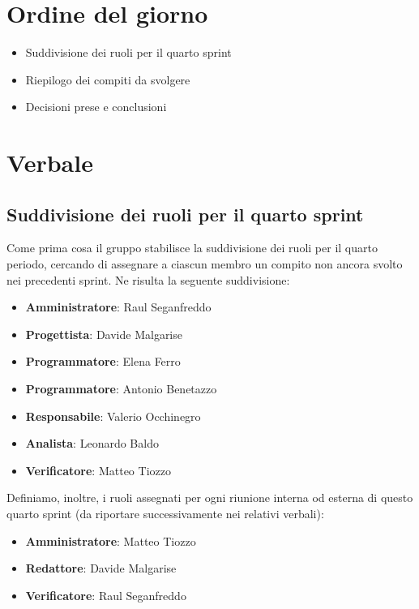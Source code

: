 \documentclass[italian,12pt]{article}
\begin{document}
\section{Ordine del giorno}
\begin{itemize}
	\item Suddivisione dei ruoli per il quarto sprint
	\item Riepilogo dei compiti da svolgere
	\item Decisioni prese e conclusioni
\end{itemize}

\newpage

\section{Verbale}

\subsection{Suddivisione dei ruoli per il quarto sprint}
Come prima cosa il gruppo stabilisce la suddivisione dei ruoli per il quarto periodo, cercando di assegnare a ciascun membro un compito non ancora svolto
nei precedenti sprint. Ne risulta la seguente suddivisione:
\begin{itemize}
	\item \textbf{Amministratore}: Raul Seganfreddo
	\item \textbf{Progettista}: Davide Malgarise
	\item \textbf{Programmatore}: Elena Ferro
	\item \textbf{Programmatore}: Antonio Benetazzo
	\item \textbf{Responsabile}: Valerio Occhinegro
	\item \textbf{Analista}: Leonardo Baldo
	\item \textbf{Verificatore}: Matteo Tiozzo
\end{itemize}
Definiamo, inoltre, i ruoli assegnati per ogni riunione interna od esterna 
di questo quarto sprint (da riportare successivamente nei relativi verbali):
\begin{itemize}
	\item \textbf{Amministratore}: Matteo Tiozzo
	\item \textbf{Redattore}: Davide Malgarise
	\item \textbf{Verificatore}: Raul Seganfreddo
\end{itemize}
\end{document}
